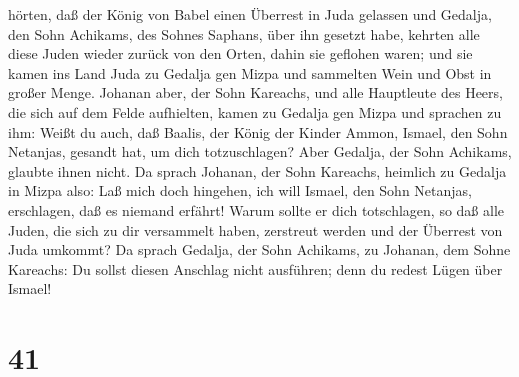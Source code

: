 hörten, daß der König von Babel einen Überrest in Juda gelassen und
Gedalja, den Sohn Achikams, des Sohnes Saphans, über ihn gesetzt habe,
 kehrten alle diese Juden wieder zurück von den Orten,
dahin sie geflohen waren; und sie kamen ins Land Juda zu Gedalja gen
Mizpa und sammelten Wein und Obst in großer Menge. 
Johanan aber, der Sohn Kareachs, und alle Hauptleute des Heers, die sich
auf dem Felde aufhielten, kamen zu Gedalja gen Mizpa und sprachen zu
ihm:  Weißt du auch, daß Baalis, der König der Kinder
Ammon, Ismael, den Sohn Netanjas, gesandt hat, um dich totzuschlagen?
Aber Gedalja, der Sohn Achikams, glaubte ihnen nicht.  Da
sprach Johanan, der Sohn Kareachs, heimlich zu Gedalja in Mizpa also:
Laß mich doch hingehen, ich will Ismael, den Sohn Netanjas, erschlagen,
daß es niemand erfährt! Warum sollte er dich totschlagen, so daß alle
Juden, die sich zu dir versammelt haben, zerstreut werden und der
Überrest von Juda umkommt?  Da sprach Gedalja, der Sohn
Achikams, zu Johanan, dem Sohne Kareachs: Du sollst diesen Anschlag
nicht ausführen; denn du redest Lügen über Ismael!

\hypertarget{section-40}{%
\section{41}\label{section-40}}


